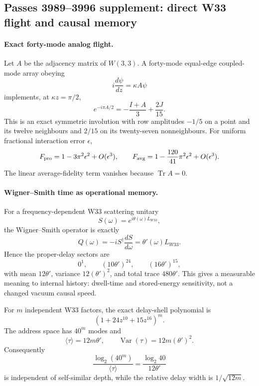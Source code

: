 %

\subsection*{Passes 3989--3996 supplement: direct W33 flight and causal memory}

\paragraph{Exact forty-mode analog flight.}
Let $A$ be the adjacency matrix of $W(3,3)$.  A forty-mode equal-edge
coupled-mode array obeying
\[
 i\frac{d\psi}{dz}=\kappa A\psi
\]
implements, at $\kappa z=\pi/2$,
\[
 \boxed{e^{-i\pi A/2}=-\frac{I+A}{3}+\frac{2J}{15}.}
\]
This is an exact symmetric involution with row amplitudes $-1/5$ on a
point and its twelve neighbours and $2/15$ on its twenty-seven
nonneighbours.  For uniform fractional interaction error $\epsilon$,
\[
 F_{\rm pro}=1-3\pi^2\epsilon^2+O(\epsilon^3),\qquad
 F_{\rm avg}=1-\frac{120}{41}\pi^2\epsilon^2+O(\epsilon^3).
\]
The linear average-fidelity term vanishes because $\operatorname{Tr}A=0$.

\paragraph{Wigner--Smith time as operational memory.}
For a frequency-dependent W33 scattering unitary
\[
 S(\omega)=e^{i\theta(\omega)L_{W33}},
\]
the Wigner--Smith operator is exactly
\[
 \boxed{Q(\omega)=-iS^\dagger\frac{dS}{d\omega}
 =\theta'(\omega)L_{W33}.}
\]
Hence the proper-delay sectors are
\[
 0^1,\qquad(10\theta')^{24},\qquad(16\theta')^{15},
\]
with mean $12\theta'$, variance $12(\theta')^2$, and total trace
$480\theta'$.  This gives a measurable meaning to internal history:
dwell-time and stored-energy sensitivity, not a changed vacuum causal
speed.

For $m$ independent W33 factors, the exact delay-shell polynomial is
\[
 \boxed{(1+24z^{10}+15z^{16})^m.}
\]
The address space has $40^m$ modes and
\[
 \langle\tau\rangle=12m\theta',\qquad
 \operatorname{Var}(\tau)=12m(\theta')^2.
\]
Consequently
\[
 \boxed{
 \frac{\log_2(40^m)}{\langle\tau\rangle}
 =\frac{\log_2 40}{12\theta'}
 }
\]
is independent of self-similar depth, while the relative delay width is
$1/\sqrt{12m}$.

